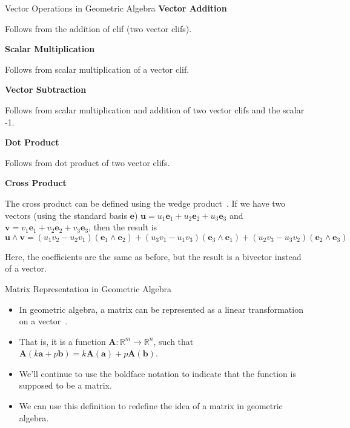 \documentclass[aspectratio=169,xcolor=dvipsnames]{beamer}
\begin{document}

\begin{frame}{Vector Operations in Geometric Algebra}
      \noindent\textbf{Vector Addition}

      Follows from the addition of clif (two vector clifs).
      
      \noindent\textbf{Scalar Multiplication}

      Follows from scalar multiplication of a vector clif.
      
      \noindent\textbf{Vector Subtraction}

      Follows from scalar multiplication and addition of two vector clifs and 
      the scalar -1.
      
      \noindent\textbf{Dot Product}

      Follows from dot product of two vector clifs.

      \noindent \textbf{Cross Product}
      
      The cross product can be defined using the wedge product~\cite{enwiki:1272926547}.
      If we have two vectors (using the standard basis $\textbf{e}$) $\mathbf{u}= u_1\mathbf e_1+u_2\mathbf e_2+u_3\mathbf e_3$ 
      and $\mathbf{v} = v_1\mathbf e_1+v_2\mathbf e_2+v_3\mathbf e_3$,
      then the result is
      $$\mathbf u \land \mathbf v = (u_1v_2 - u_2v_1)(\mathbf e_1 \land \mathbf e_2)+
      (u_3v_1 - u_1v_3)(\mathbf e_3 \land \mathbf e_1)+
      (u_2v_3 - u_3v_2)(\mathbf e_2 \land \mathbf e_3)$$

      Here, the coefficients are the same as before, but the result is a bivector
      instead of a vector.

\end{frame}


\begin{frame}{Matrix Representation in Geometric Algebra}
      \begin{itemize}
            \item In geometric algebra, a matrix can be represented as a linear transformation on 
            a vector~\cite{Mathoma2019}.
            \item That is, it is a function $\mathbf A : \mathbb{R}^m \to \mathbb{R}^n$, such that $\mathbf A(k\mathbf a + p\mathbf b)
                  = k\mathbf A(\mathbf a) + p\mathbf A(\mathbf b)$.
            \item We'll continue to use the boldface notation to indicate that the
                  function is supposed to be a matrix.
            \item We can use this definition to redefine the idea of a matrix
                  in geometric algebra.
      \end{itemize}
\end{frame}
\end{document}

